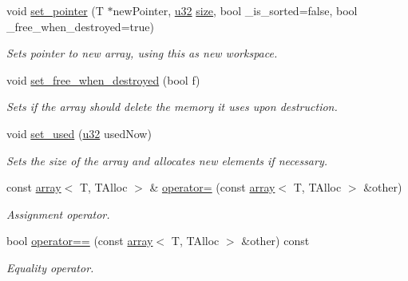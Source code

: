 \begin{DoxyCompactItemize}
void \hyperlink{classirr_1_1core_1_1array_a75df5c46b08225d1ebe3c1381d85d9ff}{set\+\_\+pointer} (T $\ast$new\+Pointer, \hyperlink{namespaceirr_a0416a53257075833e7002efd0a18e804}{u32} \hyperlink{classirr_1_1core_1_1array_ab10777d1bb278c29e159ec59b5dc9378}{size}, bool \+\_\+is\+\_\+sorted=false, bool \+\_\+free\+\_\+when\+\_\+destroyed=true)
\begin{DoxyCompactList}\small\item\em Sets pointer to new array, using this as new workspace. \end{DoxyCompactList}\item 
void \hyperlink{classirr_1_1core_1_1array_afddd43e25d3ad6b1a3d75ceab13e6c56}{set\+\_\+free\+\_\+when\+\_\+destroyed} (bool f)
\begin{DoxyCompactList}\small\item\em Sets if the array should delete the memory it uses upon destruction. \end{DoxyCompactList}\item 
void \hyperlink{classirr_1_1core_1_1array_a64d70ab89f03e2ec4deae3b6c0161305}{set\+\_\+used} (\hyperlink{namespaceirr_a0416a53257075833e7002efd0a18e804}{u32} used\+Now)
\begin{DoxyCompactList}\small\item\em Sets the size of the array and allocates new elements if necessary. \end{DoxyCompactList}\item 
\mbox{\label{classirr_1_1core_1_1array_a51c964d180507ebdef872d93886c23b2}} 
const \hyperlink{classirr_1_1core_1_1array}{array}$<$ T, T\+Alloc $>$ \& \hyperlink{classirr_1_1core_1_1array_a51c964d180507ebdef872d93886c23b2}{operator=} (const \hyperlink{classirr_1_1core_1_1array}{array}$<$ T, T\+Alloc $>$ \&other)
\begin{DoxyCompactList}\small\item\em Assignment operator. \end{DoxyCompactList}\item 
\mbox{\label{classirr_1_1core_1_1array_a794059b2ff063c9604eb46ae4edb599c}} 
bool \hyperlink{classirr_1_1core_1_1array_a794059b2ff063c9604eb46ae4edb599c}{operator==} (const \hyperlink{classirr_1_1core_1_1array}{array}$<$ T, T\+Alloc $>$ \&other) const
\begin{DoxyCompactList}\small\item\em Equality operator. \end{DoxyCompactList}\item 

\end{DoxyCompactItemize}
